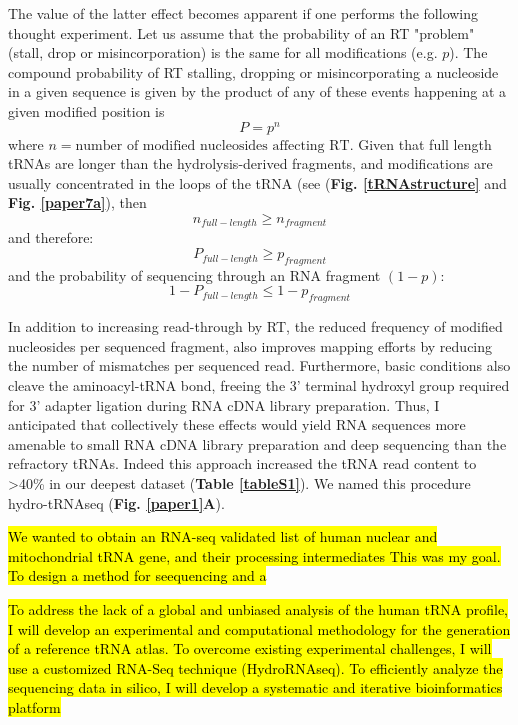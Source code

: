 \documentclass[12pt]{rockefeller}
\begin{document}
The value of the latter effect becomes apparent if one performs the following thought experiment. Let us assume that the probability of an RT "problem" (stall, drop or misincorporation) is the same for all modifications (e.g. $p$). The compound probability of RT stalling, dropping or misincorporating a nucleoside in a given sequence is given by the product of any of these events happening at a given modified position is 
\begin{equation}
P = p^n
\end{equation}
where  $n = \text{number of modified nucleosides affecting RT}$. 
Given that full length tRNAs are longer than the hydrolysis-derived fragments, and modifications are usually concentrated in the loops of the tRNA (see (\textbf{Fig. \ref{tRNAstructure}} and \textbf{Fig. \ref{paper7a}}), then 
\begin{equation}
n_{full-length} \geq n_{fragment} 
\end{equation}
and therefore: 
\begin{equation}
P_{full-length} \geq p_{fragment}
\end{equation}
and the probability of sequencing through an RNA fragment $(1-p)$:
\begin{equation}
1-P_{full-length} \leq 1-p_{fragment}
\end{equation}

In addition to increasing read-through by RT, the reduced frequency of modified nucleosides per sequenced fragment, also improves mapping efforts by reducing the number of mismatches per sequenced read. Furthermore, basic conditions also cleave the aminoacyl-tRNA bond, freeing the 3’ terminal hydroxyl group required for 3’ adapter ligation during RNA cDNA library preparation. Thus, I anticipated that collectively these effects would yield RNA sequences more amenable to small RNA cDNA library preparation and deep sequencing than the refractory tRNAs. Indeed this approach increased the tRNA read content to >40\% in our deepest dataset (\textbf{Table \ref{tableS1}}). We named this procedure hydro-tRNAseq (\textbf{Fig. \ref{paper1}A}).

\hl{We wanted to obtain an RNA-seq validated list of human nuclear and mitochondrial tRNA gene, and their processing intermediates
This was my goal. To design a method for seequencing and a}

\hl{To address the lack of a global and unbiased analysis of the human tRNA profile, I will develop an experimental and computational methodology for the generation of a reference tRNA atlas. To overcome existing experimental challenges, I will use a customized RNA-Seq technique (HydroRNAseq). To efficiently analyze the sequencing data in silico, I will develop a systematic and iterative bioinformatics platform}
\end{document}
